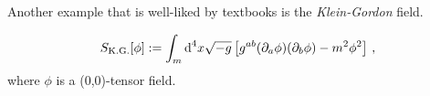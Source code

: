 Another example that is well-liked by textbooks is the \textit{Klein-Gordon} field.
\begin{example}
    \begin{equation*}
        S_\text{K.G.}[\phi] := \int_m\operatorname{d}^4\!x\sqrt{-g} \left[ 
        g^{ab}(\partial_a \phi) (\partial_b \phi) - m^2 \phi^2 \right]\,,
    \end{equation*}
    where $\phi$ is a (0,0)-tensor field.
\end{example}
